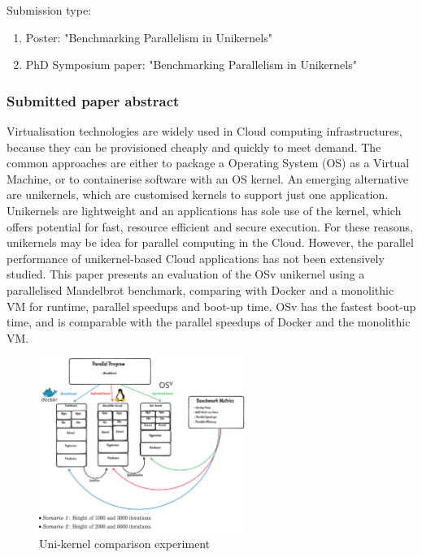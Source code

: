 Submission type:
\begin{enumerate}
    \item Poster: "Benchmarking Parallelism in Unikernels"\cite{Europar2022Poster}
    \item PhD Symposium paper: "Benchmarking Parallelism in Unikernels"\cite{Europar2022Paper}
\end{enumerate}

\subsubsection{Submitted paper abstract}
Virtualisation technologies are widely used in Cloud computing
infrastructures, because they can be provisioned cheaply and quickly
to meet demand. The common approaches are either to package a
Operating System (OS) as a Virtual Machine, or to containerise
software with an OS kernel. An emerging alternative are unikernels,
which are customised kernels to support just one application.
Unikernels are lightweight and an applications has sole use of the
kernel, which offers potential for fast, resource efficient and
secure execution. For these reasons, unikernels may be idea for
parallel computing in the Cloud. However, the parallel performance
of unikernel-based Cloud applications has not been extensively
studied.
This paper presents an evaluation of the OSv unikernel using a
parallelised Mandelbrot benchmark, comparing with Docker and a
monolithic VM for runtime, parallel speedups and boot-up time. OSv
has the fastest boot-up time, and is comparable with the parallel
speedups of Docker and the monolithic VM.


\begin{figure}[htbp!] 
    \centering    
    \includegraphics[width=0.6\textwidth]{madelbrot-expirment}
    \caption[Year1-Activity-Uni-kernel-activity-diagram]{Uni-kernel comparison experiment}
    \label{fig:UnikernelExpirement}
\end{figure}




